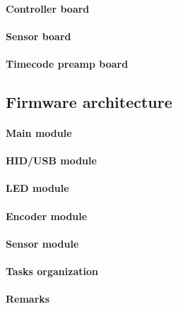 \documentclass[a4paper,10pt]{article}
\begin{document}
\begin{multicols}{2}
\TODO


\paragraph{Controller board}
\TODO


\paragraph{Sensor board}
\TODO


\paragraph{Timecode preamp board}
\TODO


\subsection{Firmware architecture}

\TODO


\paragraph{Main module}
\TODO


\paragraph{HID/USB module}
\TODO


\paragraph{LED module}
\TODO


\paragraph{Encoder module}
\TODO


\paragraph{Sensor module}
\TODO


\paragraph{Tasks organization}
\TODO


\paragraph{Remarks}
\TODO



\end{multicols}
\end{document}

